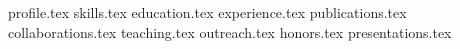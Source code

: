 \documentclass[11pt, a4paper]{awesome-cv}
\newcommand*{\sectiondir}{resume/}
\begin{document}
\makecvheader

{profile.tex} 
{skills.tex}
{education.tex} 
\clearpage
{experience.tex}
{publications.tex}
{collaborations.tex}
{teaching.tex}
\clearpage
{outreach.tex}
{honors.tex} 
{presentations.tex}
\end{document}

